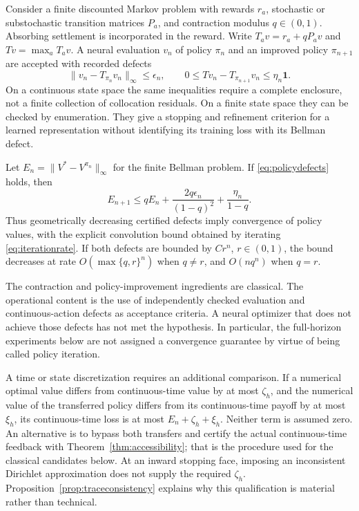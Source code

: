 Consider a finite discounted Markov problem with rewards $r_a$, stochastic or substochastic transition matrices $P_a$, and contraction modulus $q\in(0,1)$. Absorbing settlement is incorporated in the reward. Write $T_a v=r_a+qP_av$ and $Tv=\max_a T_av$. A neural evaluation $v_n$ of policy $\pi_n$ and an improved policy $\pi_{n+1}$ are accepted with recorded defects
\begin{equation}
 \|v_n-T_{\pi_n}v_n\|_\infty\leq\epsilon_n,
 \qquad 0\leq Tv_n-T_{\pi_{n+1}}v_n\leq\eta_n\mathbf1.
 \label{eq:policydefects}
\end{equation}
On a continuous state space the same inequalities require a complete enclosure, not a finite collection of collocation residuals. On a finite state space they can be checked by enumeration. They give a stopping and refinement criterion for a learned representation without identifying its training loss with its Bellman defect.

\begin{theorem}\label{thm:iteration}
Let $E_n=\|V^*-V^{\pi_n}\|_\infty$ for the finite Bellman problem. If \eqref{eq:policydefects} holds, then
\begin{equation}
 E_{n+1}\leq qE_n+\frac{2q\epsilon_n}{(1-q)^2}+\frac{\eta_n}{1-q}.
 \label{eq:iterationrate}
\end{equation}
Thus geometrically decreasing certified defects imply convergence of policy values, with the explicit convolution bound obtained by iterating \eqref{eq:iterationrate}. If both defects are bounded by $C r^n$, $r\in(0,1)$, the bound decreases at rate $O(\max\{q,r\}^n)$ when $q\ne r$, and $O(nq^n)$ when $q=r$.
\end{theorem}
The contraction and policy-improvement ingredients are classical. The operational content is the use of independently checked evaluation and continuous-action defects as acceptance criteria. A neural optimizer that does not achieve those defects has not met the hypothesis. In particular, the full-horizon experiments below are not assigned a convergence guarantee by virtue of being called policy iteration.

A time or state discretization requires an additional comparison. If a numerical optimal value differs from continuous-time value by at most $\zeta_h$, and the numerical value of the transferred policy differs from its continuous-time payoff by at most $\xi_h$, its continuous-time loss is at most $E_n+\zeta_h+\xi_h$. Neither term is assumed zero. An alternative is to bypass both transfers and certify the actual continuous-time feedback with Theorem~\ref{thm:accessibility}; that is the procedure used for the classical candidates below. At an inward stopping face, imposing an inconsistent Dirichlet approximation does not supply the required $\zeta_h$. Proposition~\ref{prop:traceconsistency} explains why this qualification is material rather than technical.

